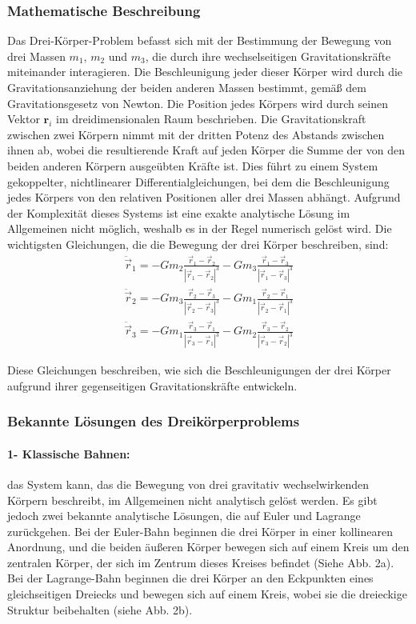 \documentclass[a4paper,12pt,twoside]{article}
\begin{document}
\subsubsection{Mathematische Beschreibung}
Das Drei-Körper-Problem befasst sich mit der Bestimmung der Bewegung von drei Massen \( m_1 \), \( m_2 \) und \( m_3 \), die durch ihre wechselseitigen Gravitationskräfte miteinander interagieren. Die Beschleunigung jeder dieser Körper wird durch die Gravitationsanziehung der beiden anderen Massen bestimmt, gemäß dem Gravitationsgesetz von Newton. Die Position jedes Körpers wird durch seinen Vektor \( \mathbf{r}_i \) im dreidimensionalen Raum beschrieben. Die Gravitationskraft zwischen zwei Körpern nimmt mit der dritten Potenz des Abstands zwischen ihnen ab, wobei die resultierende Kraft auf jeden Körper die Summe der von den beiden anderen Körpern ausgeübten Kräfte ist. Dies führt zu einem System gekoppelter, nichtlinearer Differentialgleichungen, bei dem die Beschleunigung jedes Körpers von den relativen Positionen aller drei Massen abhängt. Aufgrund der Komplexität dieses Systems ist eine exakte analytische Lösung im Allgemeinen nicht möglich, weshalb es in der Regel numerisch gelöst wird.
Die wichtigsten Gleichungen, die die Bewegung der drei Körper beschreiben, sind:
\begin{align*}
	\ddot{\vec{r}}_1 = -G m_2 \frac{\vec{r}_1 - \vec{r}_2}{|\vec{r}_1 - \vec{r}_2|^3} - G m_3 \frac{\vec{r}_1 - \vec{r}_3}{|\vec{r}_1 - \vec{r}_3|^3} \\
	\ddot{\vec{r}}_2 = -G m_3 \frac{\vec{r}_2 - \vec{r}_3}{|\vec{r}_2 - \vec{r}_3|^3} - G m_1 \frac{\vec{r}_2 - \vec{r}_1}{|\vec{r}_2 - \vec{r}_1|^3} \\
	\ddot{\vec{r}}_3 = -G m_1 \frac{\vec{r}_3 - \vec{r}_1}{|\vec{r}_3 - \vec{r}_1|^3} - G m_2 \frac{\vec{r}_3 - \vec{r}_2}{|\vec{r}_3 - \vec{r}_2|^3}
\end{align*}


Diese Gleichungen beschreiben, wie sich die Beschleunigungen der drei Körper aufgrund ihrer gegenseitigen Gravitationskräfte entwickeln.

\subsubsection{Bekannte Lösungen des Dreikörperproblems}
\paragraph{1- Klassische Bahnen: }
das System kann, das die Bewegung von drei gravitativ wechselwirkenden Körpern beschreibt, im Allgemeinen nicht analytisch gelöst werden. 
Es gibt jedoch zwei bekannte analytische Lösungen, die auf Euler und Lagrange zurückgehen. Bei der Euler-Bahn beginnen die drei Körper in einer kollinearen Anordnung, und die beiden äußeren Körper bewegen sich auf einem Kreis um den zentralen Körper, der sich im Zentrum dieses Kreises befindet (Siehe Abb. 2a). 
Bei der Lagrange-Bahn beginnen die drei Körper an den Eckpunkten eines gleichseitigen Dreiecks und bewegen sich auf einem Kreis, wobei sie die dreieckige Struktur beibehalten (siehe Abb. 2b).
\end{document}

